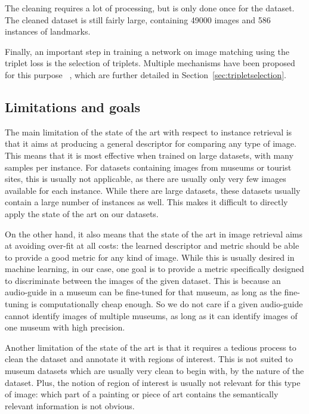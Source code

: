 The cleaning requires a lot of processing,
but is only done once for the dataset.
The cleaned dataset is still fairly large, containing 49000 images and
586 instances of landmarks.

Finally, an important step in training a network on image matching
using the triplet loss is the selection of triplets. Multiple mechanisms
have been proposed for this purpose
~\cite{schroff_facenet:_2015,gordo_end--end_2017}, which
are further detailed in Section~\ref{sec:tripletselection}.

\subsection{Limitations and goals}\label{sec:limitations}
The main limitation of the state of the art with respect to instance retrieval
is that it aims at producing a general descriptor for comparing any type
of image. This means that it
is most effective when trained on large datasets, with many samples
per instance. For datasets containing images from museums or tourist
sites, this is usually not applicable, as there are usually only very few
images available for each instance. While there are large datasets,
these datasets usually contain a large number of instances as well.
This makes it difficult to directly apply the state of the art on
our datasets.

On the other hand, it also means that the state of the art in
image retrieval aims at avoiding over-fit at all costs:
the learned descriptor and metric should
be able to provide a good metric for any kind of image.
While this is usually desired in machine learning, in our case,
one goal is to provide a metric specifically designed
to discriminate between the images of the given dataset. This is because
an audio-guide in a museum can be fine-tuned for that museum, as long
as the fine-tuning is computationally cheap enough. So we do not care
if a given audio-guide cannot identify images of multiple museums,
as long as it can identify images of one museum with high precision.

Another limitation of the state of the art is that it requires
a tedious process to clean the dataset and annotate it with regions of
interest. This is not suited to museum datasets which are usually very
clean to begin with, by the nature of the dataset. Plus, the notion of
region of interest is usually not relevant for this type of image:
which part of a painting or piece of art contains the semantically
relevant information is not obvious.

